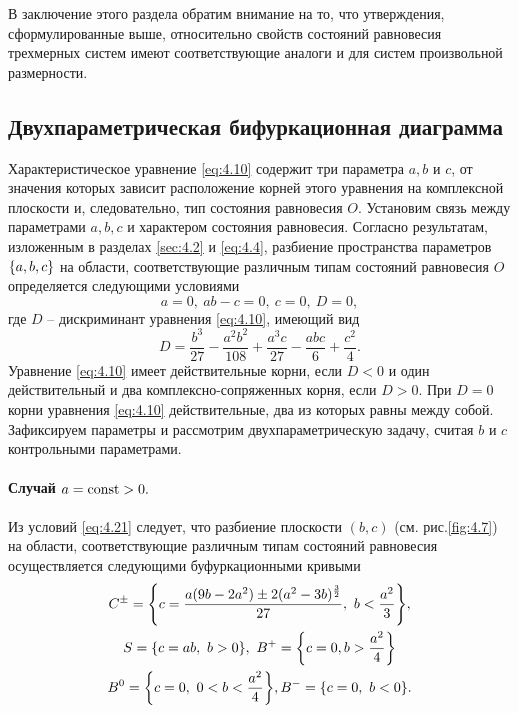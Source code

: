 В заключение этого раздела обратим внимание на то, что утверждения, сформулированные выше, относительно свойств состояний равновесия трехмерных систем имеют соответствующие аналоги и для систем произвольной размерности.

\subsection{Двухпараметрическая бифуркационная диаграмма}%
\label{sub:4.4.4}

Характеристическое уравнение \eqref{eq:4.10} содержит три параметра $a,b$ и $c$, от значения которых зависит расположение корней этого уравнения на комплексной плоскости и, следовательно, тип состояния равновесия $O$. Установим связь между параметрами $a,b,c$ и характером состояния равновесия. Согласно результатам, изложенным в разделах \ref{sec:4.2} и \ref{eq:4.4}, разбиение пространства параметров $\qty{a,b,c}$ на области, соответствующие различным типам состояний равновесия  $O$ определяется следующими условиями  
\begin{equation}
        \label{eq:4.21}
        a=0, ~ ab-c=0,~ c=0,~ D=0,
\end{equation}
где $D$ -- дискриминант уравнения \eqref{eq:4.10}, имеющий вид
\begin{equation}
        \label{eq:}
        D = \frac{b^3}{27} - \frac{a^2b^2}{108} + \frac{a^3c}{27} - \frac{abc}{6} + \frac{c^2}{4}.
\end{equation}
Уравнение \eqref{eq:4.10} имеет действительные корни, если $D<0$ и один действительный и два комплексно-сопряженных корня, если $D>0$. При $D=0$ корни уравнения \eqref{eq:4.10} действительные, два из которых равны между собой. Зафиксируем параметры и рассмотрим двухпараметрическую задачу, считая $b$ и $c$ контрольными параметрами.

\paragraph{Случай $a=\textrm{const} >0.$}%
\label{par:sluchai_a_const_0_}

Из условий \eqref{eq:4.21} следует, что разбиение плоскости $(b,c)$ (см. рис.\ref{fig:4.7})
на области, соответствующие различным типам состояний равновесия осуществляется следующими буфуркационными кривыми 
\begin{gather}
        C^{\pm} = \qty{ c = \frac{ a(9b-2a^2) \pm 2(a^2-3b)^{\frac{3}{2}}}{27},~ b<\frac{a^2}{3}},\\
        S = \qty{ c= ab, ~ b>0}, ~ B^+ = \qty{c=0, b> \frac{a^2}{4}} \\
        B^0 = \qty{c=0, ~ 0<b<\frac{a^2}{4} }, B^- =\qty{c=0,~b<0}.
\end{gather}

